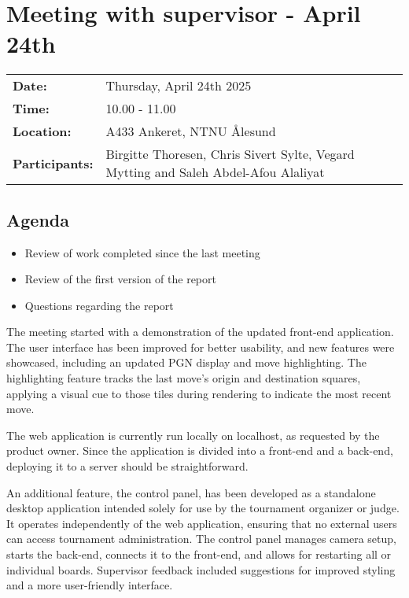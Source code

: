 \section{Meeting with supervisor - April 24th}
\begin{tabular}{ll}
    \textbf{Date:} & Thursday, April 24th 2025 \\
    \textbf{Time:} & 10.00 - 11.00\\
    \textbf{Location:} & A433 Ankeret, NTNU Ålesund \\
    \textbf{Participants:} & Birgitte Thoresen, Chris Sivert Sylte, Vegard Mytting and Saleh Abdel-Afou Alaliyat\\
\end{tabular}

\vspace{0.5cm}

\subsection{Agenda}

\begin{itemize} 
    \item Review of work completed since the last meeting
    \item Review of the first version of the report
    \item Questions regarding the report
\end{itemize}

The meeting started with a demonstration of the updated front-end application. The user interface has been improved for better usability, and new features were showcased, including an updated PGN display and move highlighting. The highlighting feature tracks the last move’s origin and destination squares, applying a visual cue to those tiles during rendering to indicate the most recent move.

The web application is currently run locally on localhost, as requested by the product owner. Since the application is divided into a front-end and a back-end, deploying it to a server should be straightforward.

An additional feature, the control panel, has been developed as a standalone desktop application intended solely for use by the tournament organizer or judge. It operates independently of the web application, ensuring that no external users can access tournament administration. The control panel manages camera setup, starts the back-end, connects it to the front-end, and allows for restarting all or individual boards. Supervisor feedback included suggestions for improved styling and a more user-friendly interface.

